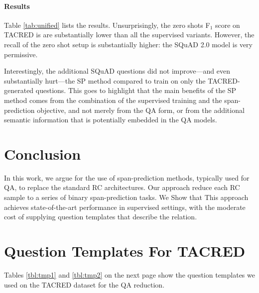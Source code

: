 \documentclass[11pt]{article}
\begin{document}
\paragraph{Results} 
Table \ref{tab:unified} lists the results.
Unsurprisingly, the zero shots F$_1$ score on TACRED is are substantially lower than all the supervised variants. However, the recall of the zero shot setup is substantially higher: the SQuAD 2.0 model is very permissive. 

Interestingly, the additional SQuAD questions did not improve---and even substantially hurt---the SP method compared to train on only the TACRED-generated questions. This goes to highlight that the main benefits of the SP method comes from the combination of the supervised training and the span-prediction objective, and not merely from the QA form, or from the additional semantic information that is potentially embedded in the QA models.

\section{Conclusion}
In this work, we argue for the use of span-prediction methods, typically used for QA, to replace the standard RC architectures. Our approach reduce each RC sample to a series of binary span-prediction tasks. We Show that This approach achieves state-of-the-art performance in supervised settings, with the moderate cost of supplying question templates that describe the relation. 





\clearpage 
\appendix
\section*{Question Templates For TACRED}
Tables \ref{tbl:tmp1} and \ref{tbl:tmp2} on the next page show the question templates we used on the TACRED dataset for the QA reduction. 
\end{document}
